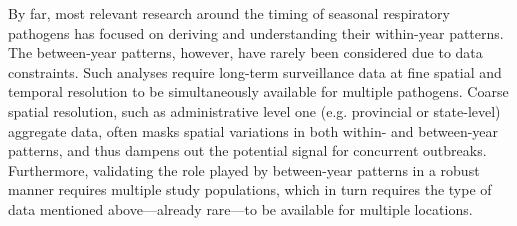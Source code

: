 By far, most relevant research around the timing of seasonal respiratory pathogens has focused on deriving and understanding their within-year patterns.
The between-year patterns, however, have rarely been considered due to data constraints.
Such analyses require long-term surveillance data at fine spatial and temporal resolution to be simultaneously available for multiple pathogens.
Coarse spatial resolution, such as administrative level one (e.g. provincial or state-level) aggregate data, often masks spatial variations in both within- and between-year patterns, and thus dampens out the potential signal for concurrent outbreaks.
Furthermore, validating the role played by between-year patterns in a robust manner requires multiple study populations, which in turn requires the type of data mentioned above—already rare—to be available for multiple locations.



